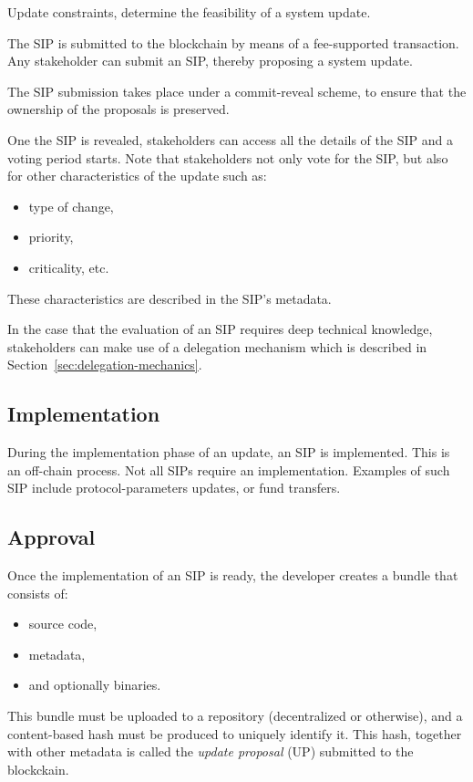 \documentclass[11pt,a4paper]{article}
\begin{document}
Update constraints, determine the feasibility of a system update.

The SIP is submitted to the blockchain by means of a fee-supported transaction.
Any stakeholder can submit an SIP, thereby proposing a system update.

The SIP submission takes place under a commit-reveal scheme, to ensure that the
ownership of the proposals is preserved.
%
%

One the SIP is revealed, stakeholders can access all the details of the SIP and
a voting period starts. Note that stakeholders not only vote for the SIP, but
also for other characteristics of the update such as:
\begin{itemize}
\item type of change,
\item priority,
\item criticality, etc.
\end{itemize}
These characteristics are described in the SIP's metadata.

In the case that the evaluation of an SIP requires deep technical knowledge,
stakeholders can make use of a delegation mechanism which is described in
Section~\ref{sec:delegation-mechanics}.

\subsection{Implementation}
\label{sec:implementation}

During the implementation phase of an update, an SIP is implemented. This is an
off-chain process. Not all SIPs require an implementation. Examples of such SIP
include protocol-parameters updates, or fund transfers.

\subsection{Approval}
\label{sec:approval}

Once the implementation of an SIP is ready, the developer creates a bundle that
consists of:
\begin{itemize}
\item source code,
\item metadata,
\item and optionally binaries.
\end{itemize}
This bundle must be uploaded to a repository (decentralized or otherwise), and a
content-based hash must be produced to uniquely identify it. This hash, together
with other metadata is called the \emph{update proposal} (UP)
submitted to the blockckain.
\end{document}
